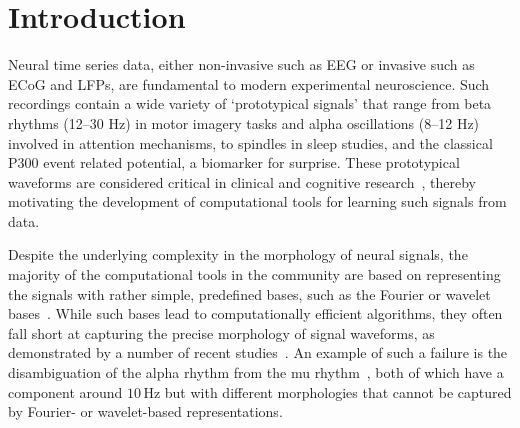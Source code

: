 \section{Introduction}
\label{sec:alphacsc_intro}
Neural time series data, either non-invasive such as \ac{EEG} 
or invasive such as \ac{ECoG} and \acp{LFP}, are fundamental to modern experimental neuroscience. Such recordings contain a wide variety of `prototypical signals' that range from beta rhythms (12--30 Hz) in motor imagery tasks and alpha oscillations (8--12 Hz) involved in attention mechanisms, to spindles in sleep studies, 
and the classical P300 event related potential, a biomarker for surprise. 
%
These prototypical waveforms are considered critical in clinical and cognitive research~\citep{cole2017brain}, thereby motivating the development of computational tools for learning such signals from data.


Despite the underlying complexity in the morphology of neural signals, the majority of the computational tools in the community are based on representing the signals with rather simple, predefined bases, such as the Fourier or wavelet bases~\citep{cohen2014analyzing}.
While such bases lead to computationally efficient algorithms, they often fall short at capturing the precise morphology of signal waveforms, as demonstrated by a number of recent studies~\citep{jones2016brain,mazaheri2008asymmetric}. An example of such a failure is the disambiguation of the alpha rhythm from the mu rhythm~\citep{hari2017meg}, both of which have a component around $10$\,Hz but with different morphologies that cannot be captured by Fourier- or wavelet-based representations.






